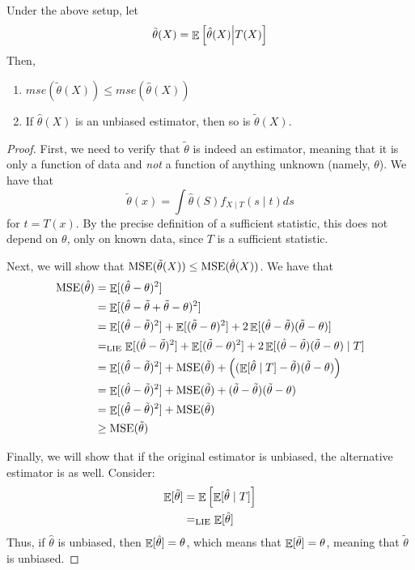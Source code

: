 \documentclass[10pt]{article}
\begin{document}
\begin{theorem}
	 Under the above setup, let
	\[
	\tilde{\theta}(X) = \mathop{\mathbb{E}} \left[ \hat{\theta}(X) \middle| T(X)\right]
	\]
	Then,
	\begin{enumerate}
		\item $mse(\tilde{\theta}(X)) \le mse(\hat{\theta}(X))$
		\item If $\hat{\theta}(X)$ is an unbiased estimator, then so is $\tilde{\theta}(X)$. 
	\end{enumerate}
\end{theorem}
\begin{proof}
	First, we need to verify that $\tilde{\theta}$ is indeed an estimator, meaning that it is only a function of data and \emph{not} a function of anything unknown (namely, $\theta$). We have that
	\[
	\tilde{\theta}(x) = \int \hat{\theta}(S) f_{X \mid T}(s \mid t) ds
	\]
	for $t = T(x)$. By the precise definition of a sufficient statistic, this does not depend on $\theta$, only on known data, since $T$ is a sufficient statistic.
	
	Next, we will show that $\mathop{\rm MSE}(\tilde{\theta}(X)) \le \mathop{\rm MSE}(\hat{\theta}(X))$. We have that
	\begin{align*}
	\mathop{\rm MSE}(\hat{\theta}) &= \mathop{\mathbb{E}}[(\hat{\theta} - \theta)^2] \\
	&= \mathop{\mathbb{E}}[(\hat{\theta} - \tilde{\theta} + \tilde{\theta} - \theta)^2] \\
	&= \mathop{\mathbb{E}}[(\hat{\theta} - \tilde{\theta})^2] + \mathop{\mathbb{E}}[(\tilde{\theta} - \theta)^2] + 2\mathop{\mathbb{E}}[(\hat{\theta} - \tilde{\theta})(\tilde{\theta} - \theta)]\\
	&=_{\text{LIE}} \mathop{\mathbb{E}}[(\hat{\theta} - \tilde{\theta})^2] + \mathop{\mathbb{E}}[(\tilde{\theta} - \theta)^2] +2\mathop{\mathbb{E}}[(\hat{\theta} - \tilde{\theta})(\tilde{\theta} - \theta) \mid T] \\
	&= \mathop{\mathbb{E}}[(\hat{\theta} - \tilde{\theta})^2] + \mathop{\rm MSE}(\tilde{\theta}) + \left( (\mathop{\mathbb{E}}[\hat{\theta} \mid T] - \tilde{\theta})(\tilde{\theta} - \theta) \right) \\
	&= \mathop{\mathbb{E}}[(\hat{\theta} - \tilde{\theta})^2] + \mathop{\rm MSE}(\tilde{\theta}) + (\tilde{\theta} - \tilde{\theta})(\tilde{\theta} - \theta) \\
	&= \mathop{\mathbb{E}}[(\hat{\theta} - \tilde{\theta})^2] + \mathop{\rm MSE}(\tilde{\theta}) \\
	&\ge \mathop{\rm MSE}(\tilde{\theta})
	\end{align*}
	
	Finally, we will show that if the original estimator is unbiased, the alternative estimator is as well. Consider:
	\begin{align*}
		\mathop{\mathbb{E}}[\tilde{\theta}] &= \mathop{\mathbb{E}}\left[\mathop{\mathbb{E}}[ \hat{\theta} \mid T]\right] \\
		&=_{\text{LIE}} \mathop{\mathbb{E}}[\hat{\theta}]
	\end{align*}
	Thus, if $\hat{\theta}$ is unbiased, then $\mathop{\mathbb{E}}[\hat{\theta}] = \theta$, which means that $\mathop{\mathbb{E}}[\tilde{\theta}] = \theta$, meaning that $\tilde{\theta}$ is unbiased. 
\end{proof}
\end{document}
